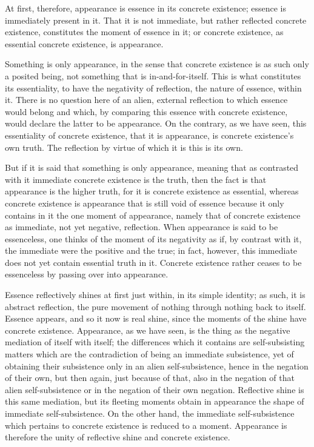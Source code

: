 At first, therefore, appearance is
essence in its concrete existence;
essence is immediately present in it.
That it is not immediate, 
but rather reflected concrete existence,
constitutes the moment of essence in it;
or concrete existence, as essential concrete existence,
is appearance.

Something is only appearance, in the sense that
concrete existence is as such only a posited being,
not something that is in-and-for-itself.
This is what constitutes its essentiality,
to have the negativity of reflection,
the nature of essence, within it.
There is no question here of an alien,
external reflection to which essence would belong
and which, by comparing this essence with concrete existence,
would declare the latter to be appearance.
On the contrary, as we have seen, 
this essentiality of concrete existence,
that it is appearance, is concrete existence's own truth.
The reflection by virtue of which it is this is its own.

But if it is said that something is only appearance,
meaning that as contrasted with it 
immediate concrete existence is the truth,
then the fact is that appearance is the higher truth,
for it is concrete existence as essential,
whereas concrete existence is appearance
that is still void of essence
because it only contains in it
the one moment of appearance,
namely that of concrete existence 
as immediate, not yet negative, reflection.
When appearance is said to be essenceless,
one thinks of the moment of its negativity as if,
by contrast with it, the immediate were
the positive and the true;
in fact, however, this immediate does not
yet contain essential truth in it.
Concrete existence rather ceases to be essenceless
by passing over into appearance.

Essence reflectively shines at first
just within, in its simple identity;
as such, it is abstract reflection, 
the pure movement of nothing through nothing back to itself.
Essence appears, and so it now is real shine,
since the moments of the shine have concrete existence.
Appearance, as we have seen, is the thing as
the negative mediation of itself with itself;
the differences which it contains are self-subsisting matters
which are the contradiction of being an immediate subsistence,
yet of obtaining their subsistence only in an alien self-subsistence,
hence in the negation of their own, but then again,
just because of that, also in the negation of that alien self-subsistence
or in the negation of their own negation.
Reflective shine is this same mediation,
but its fleeting moments obtain in appearance
the shape of immediate self-subsistence.
On the other hand, the immediate self-subsistence which
pertains to concrete existence is reduced to a moment.
Appearance is therefore the unity
of reflective shine and concrete existence.


